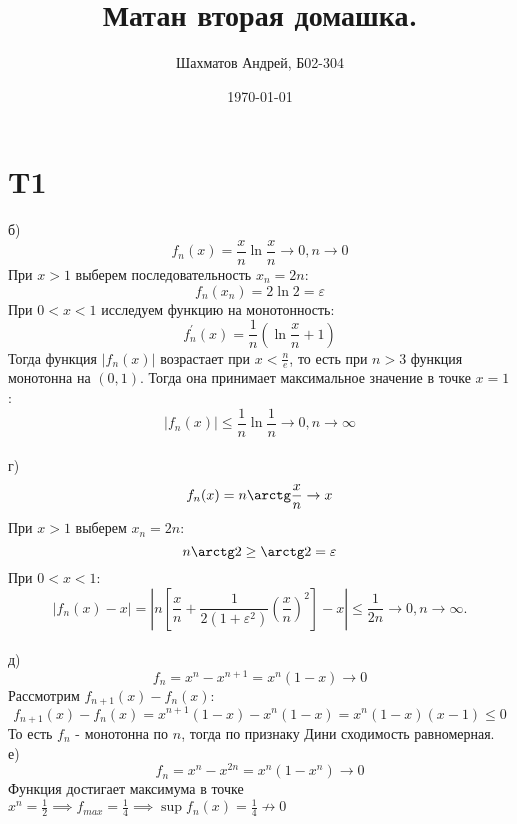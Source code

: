 \documentclass[12pt]{article}
\title{Матан вторая домашка.}
\author{Шахматов Андрей, Б02-304}
\date{\today}
\begin{document}
\maketitle
\tableofcontents

\section{T1}
б)
\[
    f_n(x) = \frac{x}{n} \ln \frac{x}{n} \to 0, n \to 0
\]
При $x > 1$ выберем последовательность $x_n = 2n$: 
\[
    f_n(x_n) = 2 \ln 2 = \varepsilon
\]
При $0 < x < 1$ исследуем функцию на монотонность: 
\[
    f_n^{\prime}(x) = \frac{1}{n} \left( \ln \frac{x}{n} + 1 \right) 
\] 
Тогда функция $\vert f_n(x) \vert $ возрастает при $x < \frac{n}{e}$, то есть при $n > 3$ функция 
монотонна на $(0, 1)$. Тогда она принимает максимальное значение в точке $x = 1$: 
\[
    \vert f_n(x) \vert \leq \frac{1}{n} \ln \frac{1}{n} \to 0, n \to \infty
\]
\\г)
\[
    f_n(x) = n \arctg \frac{x}{n} \to x
\]
При $x > 1$ выберем $x_n = 2n$: 
\[
    n \arctg 2 \geq \arctg 2 = \varepsilon 
\]  
При $0 < x < 1$: 
\[
    \left\vert f_n(x) - x \right\vert  = \left\vert n \left[ \frac{x}{n} + \frac{1}{2(1 + \varepsilon^2)} \left( \frac{x}{n} \right)^2 \right]   - x \right\vert  \leq \frac{1}{2n} \to 0, n \to \infty.   
\]
\\д) 
\[
    f_n = x^n - x^{n+1} = x^n(1 - x) \to 0 
\]
Рассмотрим $f_{n+1}(x) - f_n(x)$: 
\[
    f_{n+1}(x) - f_n(x) = x^{n+1}(1 - x) - x^n(1 - x) = x^n(1 - x)(x - 1) \leq 0  
\] 
То есть $f_n$ - монотонна по $n$, тогда по признаку Дини сходимость равномерная. 
\\е)
\[
    f_n = x^n - x^{2n} = x^n(1 - x^n) \to 0 
\]
Функция достигает максимума в точке $x^n = \frac{1}{2} \implies f_{max} = \frac{1}{4} \implies \sup f_n(x) = \frac{1}{4} \not \to 0$ 
\end{document}
